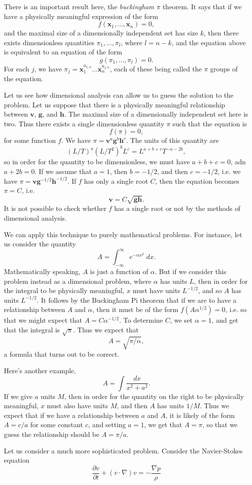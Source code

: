 There is an important result here, the \emph{buckingham $\pi$} theorem. It says that if we have a physically meaningful expression of the form
%
\[ f(\mathbf{x}_1,\dots,\mathbf{x}_n) = 0, \]
%
and the maximal size of a dimensionally independent set has size $k$, then there exists dimensionless quantities $\pi_1,\dots,\pi_l$, where $l = n-k$, and the equation above is equivalent to an equation of the form
%
\[ g(\pi_1,\dots,\pi_l) = 0. \]
%
For each $j$, we have $\pi_j = \mathbf{x}_1^{a_{1,n}} \dots \mathbf{x}_n^{a_{j,n}}$, each of these being called the $\pi$ groups of the equation.

Let us see how dimensional analysis can allow us to guess the solution to the problem. Let us suppose that there is a physically meaningful relationship between $\mathbf{v}$, $\mathbf{g}$, and $\mathbf{h}$. The maximal size of a dimensionally independent set here is two. Thus there exists a single dimensionless quantity $\pi$ such that the equation is
%
\[ f(\pi) = 0, \]
%
for some function $f$. We have $\pi = \mathbf{v}^a \mathbf{g}^b \mathbf{h}^c$. The units of this quantity are
%
\[ (L/T)^a (L/T^2)^b L^c = L^{a + b + c} T^{-a-2b}, \]
%
so in order for the quantity to be dimensionless, we must have $a + b + c = 0$, adn $a + 2b = 0$. If we assume that $a = 1$, then $b = -1/2$, and then $c = -1/2$, i.e. we have $\pi = \mathbf{v} \mathbf{g}^{-1/2} \mathbf{h}^{-1/2}$. If $f$ has only a single root $C$, then the equation becomes $\pi = C$, i.e.
%
\[ \mathbf{v} = C \sqrt{\mathbf{g} \mathbf{h}}. \]
%
It is not possible to check whether $f$ has a single root or not by the methods of dimensional analysis.

We can apply this technique to purely mathematical problems. For instance, let us consider the quantity
%
\[ A = \int_{-\infty}^\infty e^{-\alpha x^2}\; dx. \]
%
Mathematically speaking, $A$ is just a function of $\alpha$. But if we consider this problem instead as a dimensional problem, where $\alpha$ has units $L$, then in order for the integral to be physically meaningful, $x$ must have units $L^{-1/2}$, and so $A$ has units $L^{-1/2}$. It follows by the Buckingham Pi theorem that if we are to have a relationship between $A$ and $\alpha$, then it must be of the form $f(A \alpha^{1/2}) = 0$, i.e. so that we might expect that $A = C \alpha^{-1/2}$. To determine $C$, we set $\alpha = 1$, and get that the integral is $\sqrt{\pi}$. Thus we expect that
%
\[ A = \sqrt{\pi/\alpha}, \]
%
a formula that turns out to be correct.

Here's another example,
%
\[ A = \int \frac{dx}{x^2 + a^2}. \]
%
If we give $a$ units $M$, then in order for the quantity on the right to be physically meaningful, $x$ must also have units $M$, and then $A$ has units $1/M$. Thus we expect that if we have a relationship between $a$ and $A$, it is likely of the form $A = c/a$ for some constant $c$, and setting $a = 1$, we get that $A = \pi$, so that we guess the relationship should be $A = \pi / a$.

Let us consider a much more sophisticated problem. Consider the Navier-Stokes equation
%
\[ \frac{\partial v}{\partial t} + (v \cdot \nabla) v = -\frac{\nabla p}{\rho} \]











